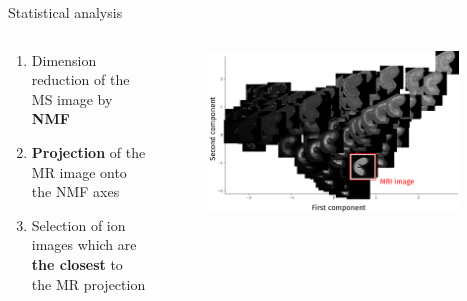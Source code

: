 \documentclass[10pt]{beamer}
\begin{document}
\begin{frame}{Statistical analysis}
  
  \begin{columns}
    \begin{column}[t]{0.6\textwidth}
      \begin{enumerate}
      \item Dimension reduction of the MS image by \textbf{NMF} 
      \item \textbf{Projection} of the MR image onto the NMF axes
      \item Selection of ion images which are \textbf{the closest} to the MR projection
      \end{enumerate}
    \end{column}
    \begin{column}[t]{0.4\textwidth}
      \begin{figure}[ht]
        \centering
        \includegraphics[width=0.95\textwidth]{fig/pca_big3_en}
      \end{figure}
    \end{column}
  \end{columns}
\end{frame}
\end{document}
